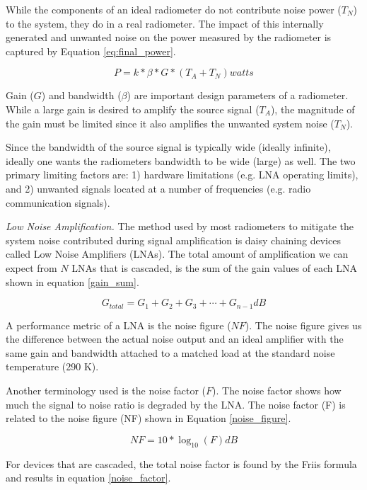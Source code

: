 While the components of an ideal radiometer do not contribute noise power ($T_N$) to the system, they do in a real radiometer.  The impact of this internally generated and unwanted noise on the power measured by the radiometer is captured by Equation \ref{eq:final_power}.

\begin{equation} \label{eq:final_power}
P=k*\beta*G*(T_{A}+T_{N}) watts
\end{equation}

Gain ($G$) and bandwidth ($\beta$) are important design parameters of a radiometer.  While a large gain is desired to amplify the source signal ($T_A$), the magnitude of the gain must be limited since it also amplifies the unwanted system noise ($T_N$).

Since the bandwidth of the source signal is typically wide (ideally infinite), ideally one wants the radiometers bandwidth to be wide (large) as well.  The two primary limiting factors are: 1) hardware limitations (e.g. LNA operating limits), and 2) unwanted signals located at a number of frequencies (e.g. radio communication signals).

\emph{Low Noise Amplification.}  The method used by most radiometers to mitigate the system noise contributed during signal amplification is daisy chaining devices called Low Noise Amplifiers (LNAs).  The total amount of amplification we can expect from $N$ LNAs that is cascaded, is the sum of the gain values of each LNA shown in equation \ref{gain_sum}.

\begin{equation}\label{gain_sum}
G_{total}=G_1 + G_2 + G_3 + \cdots +G_{n-1} dB
\end{equation}

A performance metric of a LNA is the noise figure ($NF$).  The noise figure gives us the difference between the actual noise output and an ideal amplifier with the same gain and bandwidth attached to a matched load at the standard noise temperature (290 K).

Another terminology used is the noise factor ($F$).  The noise factor shows how much the signal to noise ratio is degraded by the LNA.  The noise factor (F) is related to the noise figure (NF) shown in Equation \ref{noise_figure}.

\begin{equation}\label{noise_figure}
NF=10 * \log_{10}(F) dB
\end{equation}

For devices that are cascaded, the total noise factor is found by the Friis formula and results in equation \ref{noise_factor}.  

